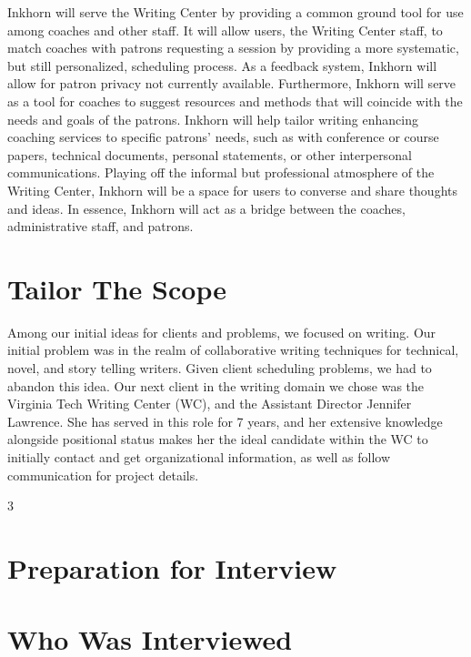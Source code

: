 \documentclass[12pt]{article} %
\begin{document}
Inkhorn will serve the Writing Center by providing a common ground tool for use among coaches and other staff.  It will allow users, the Writing Center staff, to match coaches with patrons requesting a session by providing a more systematic, but still personalized, scheduling process.  As a feedback system, Inkhorn will allow for patron privacy not currently available.  Furthermore, Inkhorn will serve as a tool for coaches to suggest resources and methods that will coincide with the needs and goals of the patrons.  Inkhorn will help tailor writing enhancing coaching services to specific patrons’ needs, such as with conference or course papers, technical documents, personal statements, or other interpersonal communications.  Playing off the informal but professional atmosphere of the Writing Center, Inkhorn will be a space for users to converse and share thoughts and ideas.  In essence, Inkhorn will act as a bridge between the coaches, administrative staff, and patrons.

\section{Tailor The Scope}

Among our initial ideas for clients and problems, we focused on writing.
Our initial problem was in the realm of collaborative writing techniques for technical, novel, and story telling writers.
Given client scheduling problems, we had to abandon this idea.
Our next client in the writing domain we chose was the Virginia Tech Writing Center (WC), and the Assistant Director Jennifer Lawrence.
She has served in this role for 7 years, and her extensive knowledge alongside positional status makes her the ideal candidate within the WC to initially contact and get organizational information, as well as follow communication for project details.

3 


\section{Preparation for Interview}

\section{Who Was Interviewed}
\end{document}
